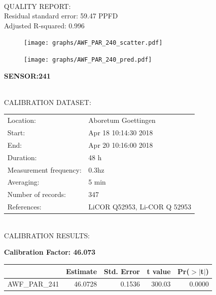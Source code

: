 \documentclass[oneside]{report}
\begin{document}
\hrulefill\\
QUALITY REPORT:\\
Residual standard error: 59.47 PPFD\\
Adjusted R-squared: 0.996



\begin{figure}[H]
  \centering
  \texttt{[image: graphs/AWF\_PAR\_240\_scatter.pdf]}
\end{figure}




\begin{figure}[H]
  \centering
  \texttt{[image: graphs/AWF\_PAR\_240\_pred.pdf]}
\end{figure}

\pagebreak


\begin{center}
\large{\textbf{SENSOR:241}}\\
\end{center}

\hrulefill\\
CALIBRATION DATASET:\\
\begin{table}[h!]
  \centering
  \label{tab:table1}
  \begin{tabular}{ll}
    Location: & Aboretum Goettingen\\ 
    
    
    Start:  & Apr 18 10:14:30 2018 \\
    End:   & Apr 20 10:16:00 2018\\ 
    Duration: & 48 h\\
    Measurement frequency: & 0.3hz\\
    Averaging:  &5 min\\
    Number of records: & 347 \\
    References: & LiCOR Q52953, Li-COR Q 52953 \\
  \end{tabular}
\end{table}

\hrulefill\\
CALIBRATION RESULTS:\\


\begin{center}
\textbf{\large{Calibration Factor: 46.073}}\\
\end{center}
\begin{table}[ht]
\centering
\begin{tabular}{rrrrr}
  \hline
 & Estimate & Std. Error & t value & Pr($>$$|$t$|$) \\ 
  \hline
AWF\_PAR\_241 & 46.0728 & 0.1536 & 300.03 & 0.0000 \\ 
   \hline
\end{tabular}
\end{table}
\end{document}

